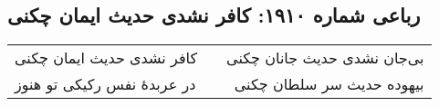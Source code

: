 \begin{center}
\section*{رباعی شماره ۱۹۱۰: کافر نشدی حدیث ایمان چکنی}
\label{sec:1910}
\begin{longtable}{l p{0.5cm} r}
کافر نشدی حدیث ایمان چکنی
&&
بی‌جان نشدی حدیث جانان چکنی
\\
در عربدهٔ نفس رکیکی تو هنوز
&&
بیهوده حدیث سر سلطان چکنی
\\
\end{longtable}
\end{center}

